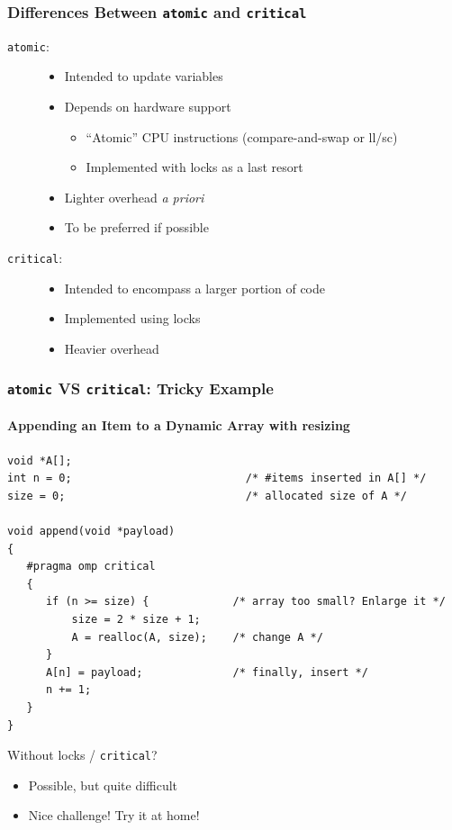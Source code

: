 \documentclass{beamer}
\begin{document}
\begin{frame}[fragile=singleslide]
  \frametitle{Differences Between \texttt{atomic} and \texttt{critical}}

\begin{description}

\item[\texttt{atomic}:]
  \begin{itemize}
    \item Intended to update variables
    \item Depends on hardware support
      \begin{itemize}
      \item ``Atomic'' CPU instructions (compare-and-swap or ll/sc)
    \item Implemented with locks as a last resort
    \end{itemize}
  \item Lighter overhead \textit{a priori}
  \item \alert{To be preferred if possible}
  \end{itemize}

\bigskip

\item[\texttt{critical}:]
  \begin{itemize}
    \item Intended to encompass a larger portion of code
    \item Implemented using locks
    \item Heavier overhead
  \end{itemize}

\end{description}
\end{frame}


\begin{frame}[fragile=singleslide]
  \frametitle{\texttt{atomic} VS \texttt{critical}: Tricky Example}
  \framesubtitle{Appending an Item to a Dynamic Array \alert{with resizing}}

\begin{verbatim}
void *A[];
int n = 0;                           /* #items inserted in A[] */
size = 0;                            /* allocated size of A */

void append(void *payload)
{
   #pragma omp critical
   {
      if (n >= size) {             /* array too small? Enlarge it */
          size = 2 * size + 1;
          A = realloc(A, size);    /* change A */
      }
      A[n] = payload;              /* finally, insert */
      n += 1;
   }
}
\end{verbatim}

\begin{alertblock}{Without locks / \texttt{critical}?}
  \begin{itemize}
  \item Possible, but quite difficult
  \item Nice challenge! Try it at home!
  \end{itemize}
\end{alertblock}
\end{frame}
\end{document}
